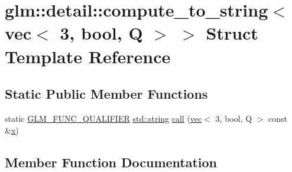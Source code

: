 \hypertarget{structglm_1_1detail_1_1compute__to__string_3_01vec_3_013_00_01bool_00_01_q_01_4_01_4}{}\section{glm\+:\+:detail\+:\+:compute\+\_\+to\+\_\+string$<$ vec$<$ 3, bool, Q $>$ $>$ Struct Template Reference}
\label{structglm_1_1detail_1_1compute__to__string_3_01vec_3_013_00_01bool_00_01_q_01_4_01_4}
\subsection*{Static Public Member Functions}
\begin{DoxyCompactItemize}
\item 
static \hyperlink{setup_8hpp_a33fdea6f91c5f834105f7415e2a64407}{G\+L\+M\+\_\+\+F\+U\+N\+C\+\_\+\+Q\+U\+A\+L\+I\+F\+I\+ER} \hyperlink{_s_d_l__opengl__glext_8h_ae84541b4f3d8e1ea24ec0f466a8c568b}{std\+::string} \hyperlink{structglm_1_1detail_1_1compute__to__string_3_01vec_3_013_00_01bool_00_01_q_01_4_01_4_a05dff60a280662ac95d5e22eae28c730}{call} (\hyperlink{structglm_1_1vec}{vec}$<$ 3, bool, Q $>$ const \&\hyperlink{_s_d_l__opengl_8h_ad0e63d0edcdbd3d79554076bf309fd47}{x})
\end{DoxyCompactItemize}


\subsection{Member Function Documentation}
\mbox{\label{structglm_1_1detail_1_1compute__to__string_3_01vec_3_013_00_01bool_00_01_q_01_4_01_4_a05dff60a280662ac95d5e22eae28c730}} 
